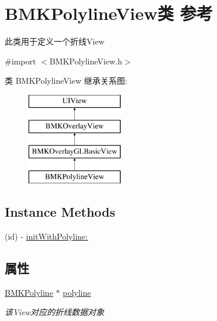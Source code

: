 \hypertarget{interface_b_m_k_polyline_view}{}\section{B\+M\+K\+Polyline\+View类 参考}
\label{interface_b_m_k_polyline_view}


此类用于定义一个折线\+View  




{\ttfamily \#import $<$B\+M\+K\+Polyline\+View.\+h$>$}

类 B\+M\+K\+Polyline\+View 继承关系图\+:\begin{figure}[H]
\begin{center}
\leavevmode
\includegraphics[height=4.000000cm]{interface_b_m_k_polyline_view}
\end{center}
\end{figure}
\subsection*{Instance Methods}
\begin{DoxyCompactItemize}
\item 
(id) -\/ \hyperlink{interface_b_m_k_polyline_view_a9e771508504ccb0fdf491dcb406e23ed}{init\+With\+Polyline\+:}
\end{DoxyCompactItemize}
\subsection*{属性}
\begin{DoxyCompactItemize}
\item 
\hypertarget{interface_b_m_k_polyline_view_a780ecfc589530cc4514e790422730e5f}{}\hyperlink{interface_b_m_k_polyline}{B\+M\+K\+Polyline} $\ast$ \hyperlink{interface_b_m_k_polyline_view_a780ecfc589530cc4514e790422730e5f}{polyline}\label{interface_b_m_k_polyline_view_a780ecfc589530cc4514e790422730e5f}

\begin{DoxyCompactList}\small\item\em 该\+View对应的折线数据对象 \end{DoxyCompactList}\end{DoxyCompactItemize}
